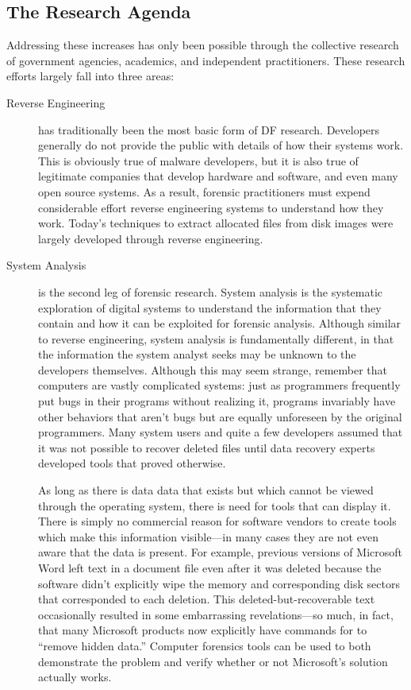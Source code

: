 \documentclass[11pt,letter]{article}
\begin{document}
\subsection{The Research Agenda}

  Addressing these increases has only been possible through the
  collective research of government agencies, academics, and
  independent practitioners. These research efforts largely fall into
  three areas:

\begin{description}
\item[Reverse Engineering] has traditionally been the most basic form
  of DF research. Developers generally do not provide the public
  with details of how their systems work. This is obviously true of
  malware developers, but it is also true of legitimate companies that
  develop hardware and software, and even many open source
  systems. As a result, forensic practitioners must expend
  considerable effort reverse engineering systems to  understand how
  they work.  Today's techniques to extract allocated files from disk
  images were largely developed through reverse engineering.

\item[System Analysis] is the second leg of forensic research. System
  analysis is the systematic exploration of digital systems to
  understand the information that they contain and how it can be
  exploited for forensic analysis. Although similar to reverse
  engineering, system analysis is fundamentally different, in that the
  information the system analyst seeks may be unknown to the
  developers themselves. Although this may seem strange, remember that
  computers are vastly complicated systems: just as programmers
  frequently put bugs in their programs without realizing it, programs
  invariably have other behaviors that aren't bugs but are equally
  unforeseen by the original programmers. Many system users and quite
  a few developers assumed that it was not possible to recover deleted
  files until data recovery experts developed tools that proved otherwise.

 As long as there is data data that exists but which cannot be viewed
 through the operating system, there is need for tools that can
 display it. There is simply no commercial reason for software vendors
 to create tools which make this information visible---in many cases
 they are not even aware that the data is present. For example,
 previous versions of Microsoft Word left text in a
 document file even after it was deleted because the software didn't
 explicitly wipe the memory and corresponding disk sectors that
 corresponded to each deletion. This deleted-but-recoverable text
 occasionally resulted in some embarrassing revelations---so much, in
 fact, that many Microsoft products now explicitly have commands for
 to ``remove hidden data.'' Computer forensics tools can be
 used to both demonstrate the problem and verify whether or not
 Microsoft's solution actually works.


\end{description}
\end{document}
